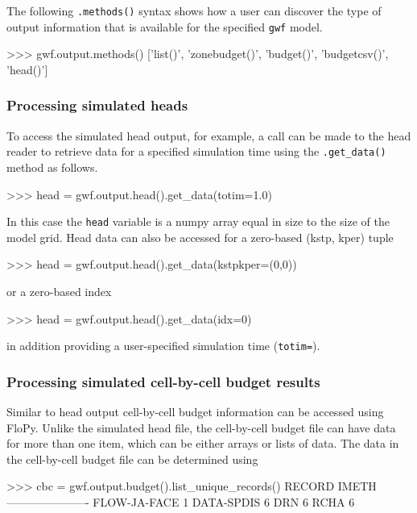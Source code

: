 \documentclass[11pt, oneside]{article}  	%
\begin{document}
The following \texttt{.methods()} syntax shows how a user can discover the type of output information that is available for the specified \texttt{gwf} model.

\begin{python}
>>> gwf.output.methods()
['list()', 'zonebudget()', 'budget()', 'budgetcsv()', 'head()']
\end{python}

\subsubsection{Processing simulated heads}

To access the simulated head output, for example, a call can be made to the head reader to retrieve data for a specified simulation time using the \texttt{.get\_data()} method as follows.

\begin{python}
>>> head = gwf.output.head().get_data(totim=1.0)
\end{python}

\noindent In this case the \texttt{head} variable is a numpy array equal in size to the size of the model grid. Head data can also be accessed for a zero-based (kstp, kper) tuple 

\begin{python}
>>> head = gwf.output.head().get_data(kstpkper=(0,0))
\end{python}

\noindent or a zero-based index

\begin{python}
>>> head = gwf.output.head().get_data(idx=0)
\end{python}

\noindent in addition providing a user-specified simulation time (\texttt{totim=}). 

\subsubsection{Processing simulated cell-by-cell budget results}

Similar to head output cell-by-cell budget information can be accessed using FloPy. Unlike the simulated head file, the cell-by-cell budget file can have data for more than one item, which can be either arrays or lists of data. The data in the cell-by-cell budget file can be determined using

\begin{python}
>>> cbc = gwf.output.budget().list_unique_records()
RECORD      IMETH
----------------------
FLOW-JA-FACE     1
DATA-SPDIS      6
DRN         6
RCHA         6
\end{python}
\end{document}
